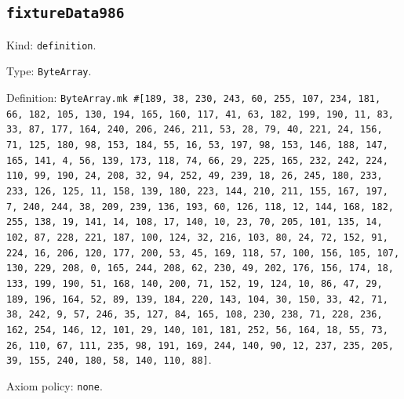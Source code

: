 \documentclass[11pt]{article}
\begin{document}
\subsection*{\texttt{fixtureData986}}
\noindent Kind: \texttt{definition}.\par
\noindent Type: \texttt{ByteArray}.\par
\noindent Definition: \texttt{ByteArray.mk \#[189, 38, 230, 243, 60, 255, 107, 234, 181, 66, 182, 105, 130, 194, 165, 160, 117, 41, 63, 182, 199, 190, 11, 83, 33, 87, 177, 164, 240, 206, 246, 211, 53, 28, 79, 40, 221, 24, 156, 71, 125, 180, 98, 153, 184, 55, 16, 53, 197, 98, 153, 146, 188, 147, 165, 141, 4, 56, 139, 173, 118, 74, 66, 29, 225, 165, 232, 242, 224, 110, 99, 190, 24, 208, 32, 94, 252, 49, 239, 18, 26, 245, 180, 233, 233, 126, 125, 11, 158, 139, 180, 223, 144, 210, 211, 155, 167, 197, 7, 240, 244, 38, 209, 239, 136, 193, 60, 126, 118, 12, 144, 168, 182, 255, 138, 19, 141, 14, 108, 17, 140, 10, 23, 70, 205, 101, 135, 14, 102, 87, 228, 221, 187, 100, 124, 32, 216, 103, 80, 24, 72, 152, 91, 224, 16, 206, 120, 177, 200, 53, 45, 169, 118, 57, 100, 156, 105, 107, 130, 229, 208, 0, 165, 244, 208, 62, 230, 49, 202, 176, 156, 174, 18, 133, 199, 190, 51, 168, 140, 200, 71, 152, 19, 124, 10, 86, 47, 29, 189, 196, 164, 52, 89, 139, 184, 220, 143, 104, 30, 150, 33, 42, 71, 38, 242, 9, 57, 246, 35, 127, 84, 165, 108, 230, 238, 71, 228, 236, 162, 254, 146, 12, 101, 29, 140, 101, 181, 252, 56, 164, 18, 55, 73, 26, 110, 67, 111, 235, 98, 191, 169, 244, 140, 90, 12, 237, 235, 205, 39, 155, 240, 180, 58, 140, 110, 88]}.\par
\noindent Axiom policy: \texttt{none}.\par
\end{document}
